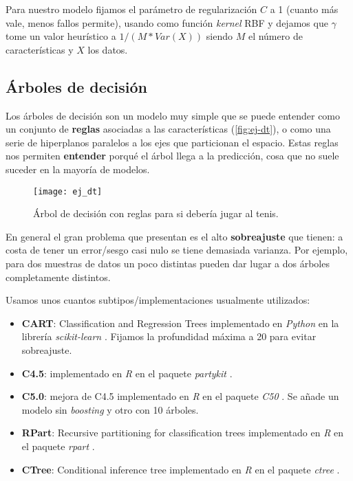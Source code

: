 Para nuestro modelo fijamos el parámetro de regularización $C$ a 1 (cuanto más vale, menos fallos permite), usando como función \emph{kernel} RBF y dejamos que $\gamma$ tome un valor heurístico a $1 / (M * Var(X))$ siendo $M$ el número de características y $X$ los datos.

\subsection{Árboles de decisión}

Los árboles de decisión son un modelo muy simple que se puede entender como un conjunto de \textbf{reglas} asociadas a las características (\autoref{fig:ej-dt}), o como una serie de hiperplanos paralelos a los ejes que particionan el espacio. Estas reglas nos permiten \textbf{entender} porqué el árbol llega a la predicción, cosa que no suele suceder en la mayoría de modelos.

\begin{figure}[htbp]
  \centering
  \texttt{[image: ej\_dt]}
  \caption{Árbol de decisión con reglas para si debería jugar al tenis.}
  \label{fig:ej-dt}
\end{figure}

En general el gran problema que presentan es el alto \textbf{sobreajuste} que tienen: a costa de tener un error/sesgo casi nulo se tiene demasiada varianza. Por ejemplo, para dos muestras de datos un poco distintas pueden dar lugar a dos árboles completamente distintos.

Usamos unos cuantos subtipos/implementaciones usualmente utilizados:

\begin{itemize}
  \item \textbf{CART}: Classification and Regression Trees \cite{breiman1984classification} implementado en \emph{Python} en la librería \emph{scikit-learn} \cite{scikit2020dt}. Fijamos la profundidad máxima a 20 para evitar sobreajuste.
  \item \textbf{C4.5}: \cite{quinlan2014c4} implementado en \emph{R} en el paquete \emph{partykit} \cite{hornik2020c45}.
  \item \textbf{C5.0}: mejora de C4.5 \cite{quinlan2019c50} implementado en \emph{R} en el paquete \emph{C50} \cite{kuhn2020c50}. Se añade un modelo sin \emph{boosting} y otro con 10 árboles.
  \item \textbf{RPart}: Recursive partitioning for classification trees \cite{breiman1984classification} implementado en \emph{R} en el paquete \emph{rpart} \cite{atkinson2019rpart}.
  \item \textbf{CTree}: Conditional inference tree \cite{hothorn2006unbiased, hothorn2015ctree} implementado en \emph{R} en el paquete \emph{ctree} \cite{hothorn2020ctree}.
\end{itemize}

